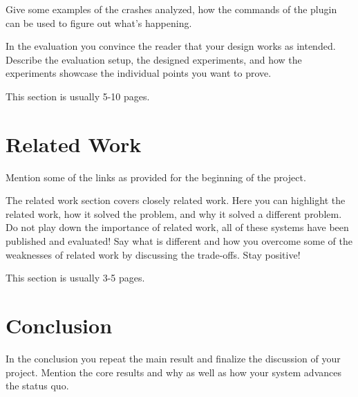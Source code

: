 \documentclass[a4paper,11pt,oneside]{report}
\begin{document}
Give some examples of the crashes analyzed, how the commands of the plugin
can be used to figure out what's happening.

In the evaluation you convince the reader that your design works as intended.
Describe the evaluation setup, the designed experiments, and how the
experiments showcase the individual points you want to prove.

This section is usually 5-10 pages.


\chapter{Related Work}

Mention some of the links as provided for the beginning of the project.

The related work section covers closely related work. Here you can highlight
the related work, how it solved the problem, and why it solved a different
problem. Do not play down the importance of related work, all of these
systems have been published and evaluated! Say what is different and how
you overcome some of the weaknesses of related work by discussing the 
trade-offs. Stay positive!

This section is usually 3-5 pages.


\chapter{Conclusion}

In the conclusion you repeat the main result and finalize the discussion of
your project. Mention the core results and why as well as how your system
advances the status quo.

\cleardoublepage{}
\printbibliography{}

%
%
\end{document}
